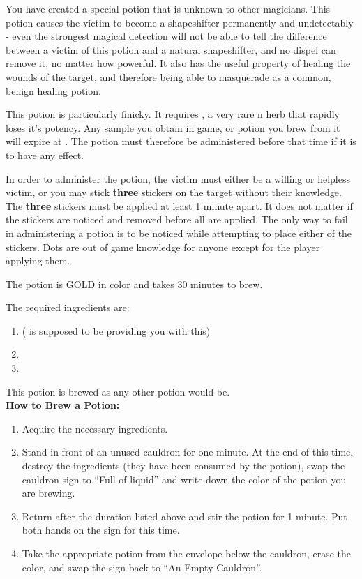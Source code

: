 \documentclass[green]{NeptuneBall}
\begin{document}
\name{\gShapeshifter{}}

You have created a special potion that is unknown to other magicians. This potion causes the victim to become a shapeshifter permanently and undetectably - even the strongest magical detection will not be able to tell the difference between a victim of this potion and a natural shapeshifter, and no dispel can remove it, no matter how powerful. It also has the useful property of healing the wounds of the target, and therefore being able to masquerade as a common, benign healing potion.

This potion is particularly finicky. It requires \iHemlock{}, a very rare \pPacifica{}n herb that rapidly loses it's potency. Any sample you obtain in game, or potion you brew from it will expire at \cTThree{\MYname{}}. The potion must therefore be administered before that time if it is to have any effect.

In order to administer the potion, the victim must either be a willing or helpless victim, or you may stick {\bf three} stickers on the target without their knowledge. The {\bf three} stickers must be applied at least 1 minute apart. It does not matter if the stickers are noticed and removed before all are applied. The only way to fail in administering a potion is to be noticed while attempting to place either of the stickers. Dots are out of game knowledge for anyone except for the player applying them.

The potion is GOLD in color and takes 30 minutes to brew. 

The required ingredients are:
\begin{enumerate}
\item \iHemlock{} (\cSpy{} is supposed to be providing you with this)
\item \iSquid{}
\item \iBarnacle{}
\end{enumerate}

This potion is brewed as any other potion would be.\\

{\bf How to Brew a Potion:}\\ %
\begin{enumerate}
  \item Acquire the necessary ingredients.
  \item Stand in front of an unused cauldron for one minute. At the end of this time, destroy the ingredients (they have been consumed by the potion), swap the cauldron sign to ``Full of liquid'' and write down the color of the potion you are brewing.
  \item Return after the duration listed above and stir the potion for 1 minute. Put both hands on the sign for this time.
  \item Take the appropriate potion from the envelope below the cauldron, erase the color, and swap the sign back to ``An Empty Cauldron''.
\end{enumerate}
\end{document}
